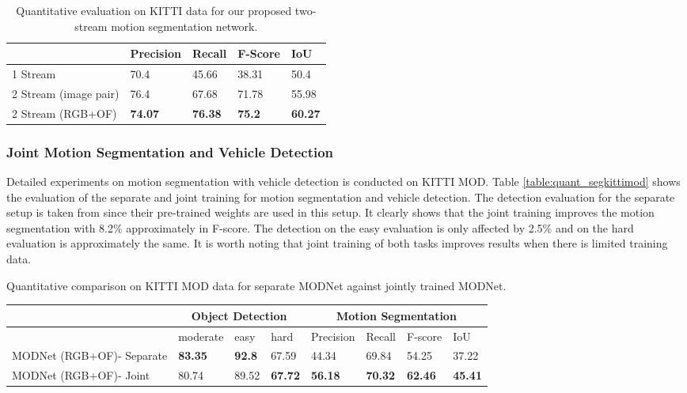\documentclass[letterpaper, 10 pt, conference]{ieeeconf}  %
\begin{document}
\begin{table}[ht!]
\centering
\caption{Quantitative evaluation on KITTI data for our proposed two-stream motion segmentation network. }
\begin{tabular}{|l|l|l|l|l|}
\hline
 & Precision & Recall & F-Score & IoU \\ \hline
1 Stream & 70.4 & 45.66 & 38.31 & 50.4\\ \hline
2 Stream (image pair) & 76.4 & 67.68 & 71.78 & 55.98\\ \hline
2 Stream (RGB+OF) & \textbf{74.07} & \textbf{76.38} & \textbf{75.2} & \textbf{60.27} \\ \hline
\end{tabular}
\label{table:quant_seg}
\end{table}\subsubsection{Joint Motion Segmentation and Vehicle Detection} Detailed experiments on motion segmentation with vehicle detection is conducted on KITTI MOD. Table \ref{table:quant_segkittimod} shows the evaluation of the separate and joint training for motion segmentation and vehicle detection. The detection evaluation for the separate setup is taken from \cite{teichmann2016multinet} since their pre-trained weights are used in this setup. It clearly shows that the joint training improves the motion segmentation with 8.2\% approximately in F-score. The detection on the easy evaluation is only affected by 2.5\% and on the hard evaluation is approximately the same. It is worth noting that joint training of both tasks improves results when there is limited training data.
\centering
\caption{Quantitative comparison on KITTI MOD data for separate MODNet against jointly trained MODNet.}
\begin{tabular}{|l|l|l|l|l|l|l|l|}
\hline
 & \multicolumn{3}{|c|}{Object Detection} & \multicolumn{4}{|c|}{Motion Segmentation} \\\hline
  & moderate & easy & hard & Precision & Recall & F-score & IoU \\ \hline
MODNet (RGB+OF)- Separate & \textbf{83.35} & \textbf{92.8} & 67.59 & 44.34 & 69.84 & 54.25 & 37.22\\ \hline
MODNet (RGB+OF)- Joint & 80.74 &  89.52 & \textbf{67.72} & \textbf{56.18} & \textbf{70.32} & \textbf{62.46} & \textbf{45.41}\\ \hline
\end{tabular}
\end{document}
